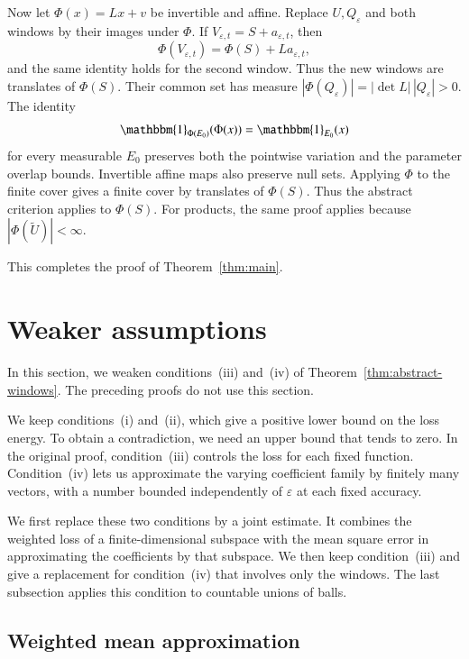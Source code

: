 \documentclass[10pt,a4paper]{amsart}
\newcommand\1{\mathbbm{1}}
\newcommand{\eps}{\varepsilon}
\begin{document}
Now let $\Phi(x)=Lx+v$ be invertible and affine. Replace $U,Q_\eps$ and both
windows by their images under $\Phi$. If $V_{\eps,t}=S+a_{\eps,t}$, then
\begin{equation*}
    \Phi(V_{\eps,t})=\Phi(S)+La_{\eps,t},
\end{equation*}
and the same identity holds for the second window.
Thus the new windows are translates of $\Phi(S)$.
Their common set has measure
$|\Phi(Q_\eps)|=|\det L|\,|Q_\eps|>0$.
The identity
\begin{equation*}
    \1_{\Phi(E_0)}(\Phi(x))=\1_{E_0}(x)
\end{equation*}
for every measurable $E_0$ preserves both the pointwise variation and the
parameter overlap bounds. Invertible affine maps also preserve null sets.
Applying $\Phi$ to the finite cover gives a finite cover by translates
of $\Phi(S)$. Thus the abstract criterion applies to $\Phi(S)$.
For products, the same proof applies because $|\Phi(\widetilde U)|<\infty$.

This completes the proof of Theorem~\ref{thm:main}.

\section{Weaker assumptions}\label{sec:weaker-assumptions}

In this section, we weaken conditions~(iii) and~(iv) of
Theorem~\ref{thm:abstract-windows}. The preceding proofs do not use this section.

We keep conditions~(i) and~(ii), which give a positive lower bound on the loss
energy. To obtain a contradiction, we need an upper bound that tends to zero.
In the original proof, condition~(iii) controls the loss for each fixed
function. Condition~(iv) lets us approximate the varying coefficient family
by finitely many vectors, with a number bounded independently of $\eps$
at each fixed accuracy.

We first replace these two conditions by a joint estimate. It combines
the weighted loss of a finite-dimensional subspace with the mean square
error in approximating the coefficients by that subspace.
We then keep condition~(iii) and give a replacement for condition~(iv)
that involves only the windows. The last subsection applies this condition
to countable unions of balls.

\subsection{Weighted mean approximation}
\end{document}

